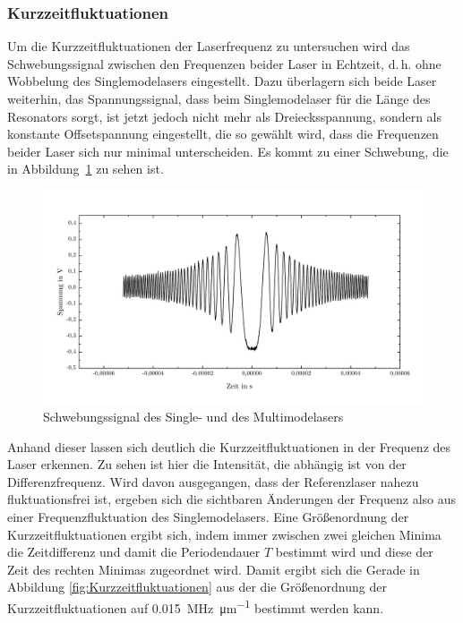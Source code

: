 \documentclass[a4paper,twoside,final]{article}
\begin{document}
\subsubsection{Kurzzeitfluktuationen}
Um die Kurzzeitfluktuationen der Laserfrequenz zu untersuchen wird das Schwebungssignal zwischen den Frequenzen beider Laser in Echtzeit, d.\,h. ohne Wobbelung des Singlemodelasers eingestellt. Dazu überlagern sich beide Laser weiterhin, das Spannungssignal, dass beim Singlemodelaser für die Länge des Resonators sorgt, ist jetzt jedoch nicht mehr als Dreiecksspannung, sondern als konstante Offsetspannung eingestellt, die so gewählt wird, dass die Frequenzen beider Laser sich nur minimal unterscheiden. Es kommt zu einer Schwebung, die in Abbildung~\ref{fig:Schwebung} zu sehen ist.

\begin{figure}[htp]
  \vspace{-5mm}
    \centering
        \includegraphics[width=1\textwidth]{Bilder/Schwebungssignal.pdf}
    \caption{Schwebungssignal des Single- und des Multimodelasers}
    \label{fig:Schwebung}
\end{figure}

Anhand dieser lassen sich deutlich die Kurzzeitfluktuationen in der Frequenz des Laser erkennen. Zu sehen ist hier die Intensität, die abhängig ist von der Differenzfrequenz. Wird davon ausgegangen, dass der Referenzlaser nahezu fluktuationsfrei ist, ergeben sich die sichtbaren Änderungen der Frequenz also aus einer Frequenzfluktuation des Singlemodelasers. Eine Größenordnung der Kurzzeitfluktuationen ergibt sich, indem immer zwischen zwei gleichen Minima die Zeitdifferenz und damit die Periodendauer $T$ bestimmt wird und diese der Zeit des rechten Minimas zugeordnet wird. Damit ergibt sich die Gerade in Abbildung \ref{fig:Kurzzeitfluktuationen} aus der die Größenordnung der Kurzzeitfluktuationen auf \SI{0,015}{\mega\hertz\per\micro\meter} bestimmt werden kann.
\end{document}
